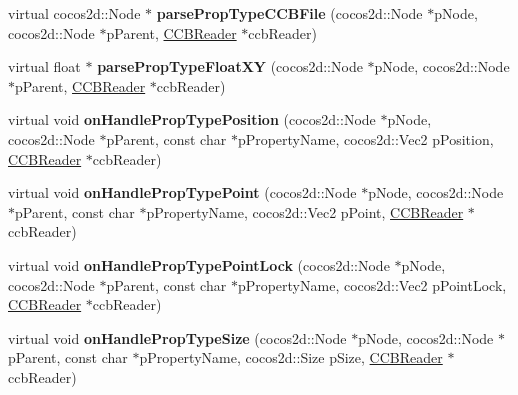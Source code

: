 \begin{DoxyCompactItemize}
\mbox{\label{classcocosbuilder_1_1NodeLoader_a78982a32625c0c14f1088762248a7de2}} 
virtual cocos2d\+::\+Node $\ast$ {\bfseries parse\+Prop\+Type\+C\+C\+B\+File} (cocos2d\+::\+Node $\ast$p\+Node, cocos2d\+::\+Node $\ast$p\+Parent, \hyperlink{classcocosbuilder_1_1CCBReader}{C\+C\+B\+Reader} $\ast$ccb\+Reader)
\item 
\mbox{\label{classcocosbuilder_1_1NodeLoader_ac9e0284fa5bb287a4bbaee07f3f30f11}} 
virtual float $\ast$ {\bfseries parse\+Prop\+Type\+Float\+XY} (cocos2d\+::\+Node $\ast$p\+Node, cocos2d\+::\+Node $\ast$p\+Parent, \hyperlink{classcocosbuilder_1_1CCBReader}{C\+C\+B\+Reader} $\ast$ccb\+Reader)
\item 
\mbox{\label{classcocosbuilder_1_1NodeLoader_ad709cd47b6b373ed7bc08e1d5562c7d6}} 
virtual void {\bfseries on\+Handle\+Prop\+Type\+Position} (cocos2d\+::\+Node $\ast$p\+Node, cocos2d\+::\+Node $\ast$p\+Parent, const char $\ast$p\+Property\+Name, cocos2d\+::\+Vec2 p\+Position, \hyperlink{classcocosbuilder_1_1CCBReader}{C\+C\+B\+Reader} $\ast$ccb\+Reader)
\item 
\mbox{\label{classcocosbuilder_1_1NodeLoader_aa08b42107ac1b3d7d4df2c4b9ff9e881}} 
virtual void {\bfseries on\+Handle\+Prop\+Type\+Point} (cocos2d\+::\+Node $\ast$p\+Node, cocos2d\+::\+Node $\ast$p\+Parent, const char $\ast$p\+Property\+Name, cocos2d\+::\+Vec2 p\+Point, \hyperlink{classcocosbuilder_1_1CCBReader}{C\+C\+B\+Reader} $\ast$ccb\+Reader)
\item 
\mbox{\label{classcocosbuilder_1_1NodeLoader_acad4b212ec263a6aa1bf3fce7a38b65e}} 
virtual void {\bfseries on\+Handle\+Prop\+Type\+Point\+Lock} (cocos2d\+::\+Node $\ast$p\+Node, cocos2d\+::\+Node $\ast$p\+Parent, const char $\ast$p\+Property\+Name, cocos2d\+::\+Vec2 p\+Point\+Lock, \hyperlink{classcocosbuilder_1_1CCBReader}{C\+C\+B\+Reader} $\ast$ccb\+Reader)
\item 
\mbox{\label{classcocosbuilder_1_1NodeLoader_a851417d89fffab9fd9dbd9e6d70e38c4}} 
virtual void {\bfseries on\+Handle\+Prop\+Type\+Size} (cocos2d\+::\+Node $\ast$p\+Node, cocos2d\+::\+Node $\ast$p\+Parent, const char $\ast$p\+Property\+Name, cocos2d\+::\+Size p\+Size, \hyperlink{classcocosbuilder_1_1CCBReader}{C\+C\+B\+Reader} $\ast$ccb\+Reader)

\end{DoxyCompactItemize}
